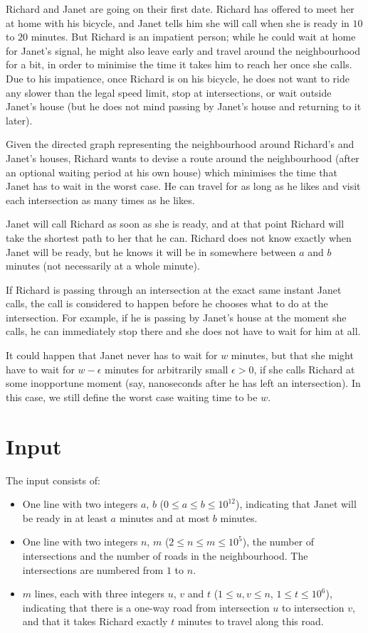 
Richard and Janet are going on their first date. Richard has offered to meet
her at home with his bicycle, and Janet tells him she will call when she is
ready in $10$ to $20$ minutes.
But Richard is an impatient person; while he could wait at home for Janet's
signal, he might also leave early and travel around the neighbourhood for a bit,
in order to minimise the time it takes him to reach her once she calls.
Due to his impatience, once Richard is on his bicycle, he does not want to
ride any slower than the legal speed limit, stop at intersections, or
wait outside Janet's house (but he does not mind passing by Janet's house and
returning to it later).

Given the directed graph representing the neighbourhood around Richard's and
Janet's houses, Richard wants to devise a route around the
neighbourhood (after an optional waiting period at his own house) which
minimises the time that Janet has to wait in the worst case. He can travel for
as long as he likes and visit each intersection as many times as he likes.

Janet will call Richard as soon as she is ready, and at that point Richard will
take the shortest path to her that he can.
Richard does not know exactly when Janet will be ready, but he knows it will be
in somewhere between $a$ and $b$ minutes (not necessarily at a whole minute).

If Richard is passing through an intersection at the exact same instant Janet
calls, the call is considered to happen before he chooses what to do at the
intersection. For example, if he is passing by Janet's house at the moment she
calls, he can immediately stop there and she does not have to wait for him at
all.

It could happen that Janet never has to wait for $w$ minutes, but that
she might have to wait for $w - \epsilon$ minutes for arbitrarily
small $\epsilon > 0$, if she calls Richard at some inopportune moment
(say, nanoseconds after he has left an intersection).  In this case,
we still define the worst case waiting time to be $w$.

\section*{Input}
The input consists of:
\begin{itemize}
\item One line with two integers $a$, $b$ ($0 \le a \le b \le 10^{12}$), indicating
that Janet will be ready in at least $a$ minutes and at most $b$ minutes.
\item One line with two integers $n$, $m$ ($2 \le n \le m \le 10^5$), the number of
intersections and the number of roads in the neighbourhood.  The intersections are numbered from $1$ to $n$.
\item $m$ lines, each with three integers $u$, $v$ and $t$ ($1 \le u,v \le n$, $1 \le t
\le 10^6$), indicating that there is a one-way road from intersection $u$ to
intersection $v$, and that it takes Richard exactly $t$ minutes to travel along
this road.
\end{itemize}

